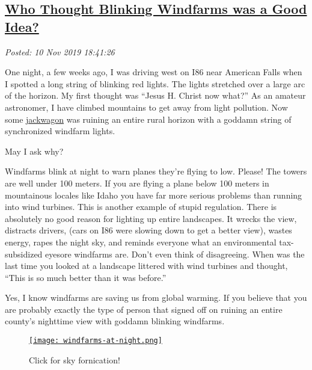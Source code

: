 %

\subsection*{\href{http://analyzethedatanotthedrivel.org/2019/11/10/who-thought-blinking-windfarms-was-a-good-idea/}{Who Thought Blinking Windfarms was a Good Idea?}}


\noindent\emph{Posted: 10 Nov 2019 18:41:26}
\vspace{6pt}

One night, a few weeks ago, I was driving west on I86 near American
Falls when I spotted a long string of blinking red lights. The
lights stretched over a large arc of the horizon. My first thought was
``Jesus H. Christ now what?'' As an amateur astronomer, I have climbed
mountains to get away from light pollution. Now some 
\href{https://www.urbandictionary.com/define.php?term=Jack%20wagon}{jackwagon} was
ruining an entire rural horizon with a goddamn string of synchronized
windfarm lights.

May I ask why?

Windfarms blink at night to warn planes they're flying to low. Please!
The towers are well under 100 meters. If you are flying a plane below
100 meters in mountainous locales like Idaho you have far more serious
problems than running into wind turbines. This is another example of
stupid regulation. There is absolutely no good reason for lighting up
entire landscapes. It wrecks the view, distracts drivers, (cars on I86
were slowing down to get a better view), wastes energy, rapes the night
sky, and reminds everyone what an environmental tax-subsidized eyesore
windfarms are. Don't even think of disagreeing. When was the last time
you looked at a landscape littered with wind turbines and thought,
``This is so much better than it was before.''

Yes, I know windfarms are saving us from global warming. If you believe
that you are probably exactly the type of person that signed off on
ruining an entire county's nighttime view with goddamn blinking
windfarms.

\captionsetup[figure]{labelformat=empty}
\begin{figure}[htbp]
\centering
\href{https://www.youtube.com/watch?v=JDztGwEqiwQ}{\texttt{[image: windfarms-at-night.png]}}
\caption{Click for sky fornication!}
\label{fig:5643x0}
\end{figure}



%
 